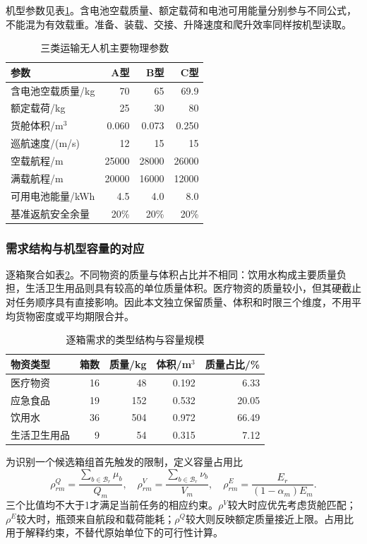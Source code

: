 \documentclass[withoutpreface,colorprint]{format}
\numberwithin{equation}{section}
\numberwithin{figure}{section}
\numberwithin{table}{section}
\begin{document}
机型参数见表\ref{tab:common_drone}。含电池空载质量、额定载荷和电池可用能量分别参与不同公式，不能混为有效载重。准备、装载、交接、升降速度和爬升效率同样按机型读取。
\begin{table}[htbp]\centering\small
\caption{三类运输无人机主要物理参数}\label{tab:common_drone}
\begin{tabular}{lrrr}\toprule 参数 & A型 & B型 & C型\\\midrule
含电池空载质量/kg &70&65&69.9\\
额定载荷/kg &25&30&80\\
货舱体积/m$^3$ &0.060&0.073&0.250\\
巡航速度/(m/s)&12&15&15\\
空载航程/m&25000&28000&26000\\
满载航程/m&20000&16000&12000\\
可用电池能量/kWh&4.5&4.0&8.0\\
基准返航安全余量&20\%&20\%&20\%\\\bottomrule
\end{tabular}
\end{table}


\subsubsection{需求结构与机型容量的对应}
逐箱聚合如表\ref{tab:rev_cargo}。不同物资的质量与体积占比并不相同：饮用水构成主要质量负担，生活卫生用品则具有较高的单位质量体积。医疗物资的质量较小，但其硬截止对任务顺序具有直接影响。因此本文独立保留质量、体积和时限三个维度，不用平均货物密度或平均期限合并。

\begin{table}[htbp]\centering\small
\caption{逐箱需求的类型结构与容量规模}\label{tab:rev_cargo}
\begin{tabular}{lrrrr}\toprule
物资类型 & 箱数 & 质量/kg & 体积/m$^3$ & 质量占比/\%\\\midrule
医疗物资 & 16 & 48 & 0.192 & 6.33\\
应急食品 & 19 & 152 & 0.532 & 20.05\\
饮用水 & 36 & 504 & 0.972 & 66.49\\
生活卫生用品 & 9 & 54 & 0.315 & 7.12\\
\bottomrule\end{tabular}
\end{table}


为识别一个候选箱组首先触发的限制，定义容量占用比
\begin{equation}
 \rho_{rm}^{Q}=\frac{\sum_{b\in\mathcal B_r}\mu_b}{Q_m},\quad
 \rho_{rm}^{V}=\frac{\sum_{b\in\mathcal B_r}\nu_b}{V_m},\quad
 \rho_{rm}^{E}=\frac{E_r}{(1-\alpha_m)E_m}.
 \label{eq:dimensionless_capacity}
\end{equation}
三个比值均不大于1才满足当前任务的相应约束。$\rho^V$较大时应优先考虑货舱匹配；$\rho^E$较大时，瓶颈来自航段和载荷能耗；$\rho^Q$较大则反映额定质量接近上限。占用比用于解释约束，不替代原始单位下的可行性计算。
\end{document}
